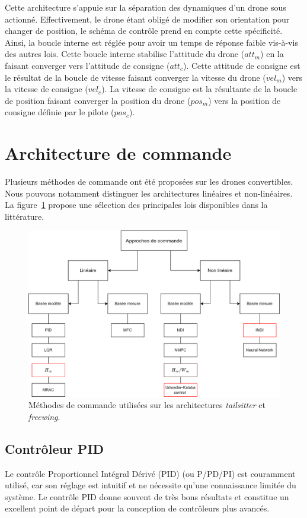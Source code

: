 Cette architecture s'appuie sur la séparation des dynamiques d'un drone sous actionné. Effectivement, le drone étant obligé de modifier son orientation pour changer de position, le schéma de contrôle prend en compte cette spécificité. Ainsi, la boucle interne est réglée pour avoir un temps de réponse faible vis-à-vis des autres lois. Cette boucle interne stabilise l'attitude du drone ($att_{m}$) en la faisant converger vers l'attitude de consigne ($att_{c}$). Cette attitude de consigne est le résultat de la boucle de vitesse faisant converger la vitesse du drone ($vel_{m}$) vers la vitesse de consigne ($vel_{c}$). La vitesse de consigne est la résultante de la boucle de position faisant converger la position du drone ($pos_{m}$) vers la position de consigne définie par le pilote ($pos_{c}$).


\section{Architecture de commande}
\label{sec:archcmd}
Plusieurs méthodes de commande ont été proposées sur les drones convertibles. Nous pouvons notamment distinguer les architectures linéaires et non-linéaires. La figure~\ref{fig:methodecmd} propose une sélection des principales lois disponibles dans la littérature.

\begin{figure}[H]
    \centerline{
    \includegraphics[trim=0cm 0cm 0cm 0cm,clip,width=0.8\columnwidth]{figures/controle_methode.png}}
    \caption{Méthodes de commande utilisées sur les architectures \textit{tailsitter} et \textit{freewing}.}
    \label{fig:methodecmd}
\end{figure}


\subsection*{Contrôleur PID}
\label{sec:PID}
Le contrôle Proportionnel Intégral Dérivé (PID) (ou P/PD/PI) est couramment utilisé, car son réglage est intuitif et ne nécessite qu'une connaissance limitée du système. Le contrôle PID donne souvent de très bons résultats et constitue un excellent point de départ pour la conception de contrôleurs plus avancés.

